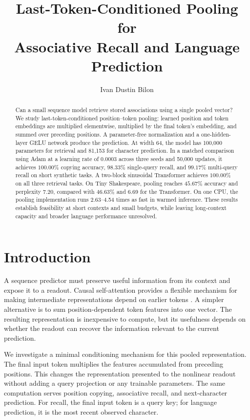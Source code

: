\documentclass[11pt]{article}
\title{Last-Token-Conditioned Pooling for\\Associative Recall and Language Prediction}
\author{Ivan Dustin Bilon}
\date{}
\begin{document}
\maketitle
\begin{abstract}
Can a small sequence model retrieve stored associations using a single pooled vector? We study last-token-conditioned position--token pooling: learned position and token embeddings are multiplied elementwise, multiplied by the final token's embedding, and summed over preceding positions. A parameter-free normalization and a one-hidden-layer GELU network produce the prediction. At width 64, the model has 100,000 parameters for retrieval and 81,153 for character prediction. In a matched comparison using Adam at a learning rate of 0.0003 across three seeds and 50,000 updates, it achieves $100.00\%$ copying accuracy, $98.33\%$ single-query recall, and $99.17\%$ multi-query recall on short synthetic tasks. A two-block sinusoidal Transformer achieves $100.00\%$ on all three retrieval tasks. On Tiny Shakespeare, pooling reaches $45.67\%$ accuracy and perplexity 7.20, compared with $46.63\%$ and 6.69 for the Transformer. On one CPU, the pooling implementation runs 2.63--4.54 times as fast in warmed inference. These results establish feasibility at short contexts and small budgets, while leaving long-context capacity and broader language performance unresolved.

\end{abstract}

\section{Introduction}
A sequence predictor must preserve useful information from its context and expose it to a readout. Causal self-attention provides a flexible mechanism for making intermediate representations depend on earlier tokens \cite{transformer}. A simpler alternative is to sum position-dependent token features into one vector. The resulting representation is inexpensive to compute, but its usefulness depends on whether the readout can recover the information relevant to the current prediction.

We investigate a minimal conditioning mechanism for this pooled representation. The final input token multiplies the features accumulated from preceding positions. This changes the representation presented to the nonlinear readout without adding a query projection or any trainable parameters. The same computation serves position copying, associative recall, and next-character prediction. For recall, the final input token is a query key; for language prediction, it is the most recent observed character.
\end{document}
